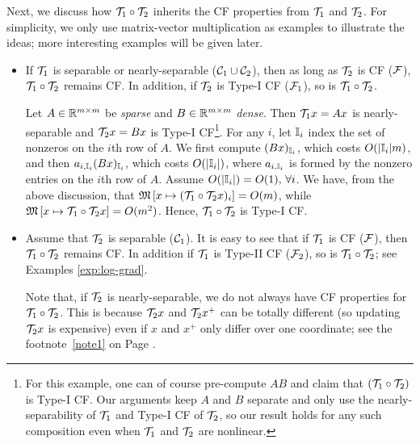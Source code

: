 Next, we discuss how ${\mathcal{T}}_1\circ {\mathcal{T}}_2$ inherits the CF properties from ${\mathcal{T}}_1$ and ${\mathcal{T}}_2$. For simplicity, we only use matrix-vector multiplication as examples to illustrate the ideas; more interesting examples will be given later.%
\begin{itemize}

\item If ${\mathcal{T}}_1$ is separable or nearly-separable (${\mathcal{C}}_1\cup{\mathcal{C}}_2$), then as long as ${\mathcal{T}}_2$ is CF (${\mathcal{F}}$), ${\mathcal{T}}_1\circ{\mathcal{T}}_2$ remains CF. In addition, if ${\mathcal{T}}_2$ is Type-I CF (${\mathcal{F}}_1$), so is ${\mathcal{T}}_1\circ{\mathcal{T}}_2$. 
\begin{example}\label{exp:sp-dens}
Let $A\in\mathbb{R}^{m\times m}$ be \emph{sparse} and $B\in\mathbb{R}^{m\times m}$ \emph{dense}. Then ${\mathcal{T}}_1 x=Ax$ is nearly-separable and ${\mathcal{T}}_2 x=Bx$ is Type-I CF\footnote{For this example, one can of course pre-compute $AB$ and claim that $({\mathcal{T}}_1\circ{\mathcal{T}}_2)$ is Type-I CF. Our arguments keep $A$ and $B$ separate and only use the nearly-separability of ${\mathcal{T}}_1$ and Type-I CF of ${\mathcal{T}}_2$, so our result holds for any such composition even when ${\mathcal{T}}_1$ and ${\mathcal{T}}_2$ are nonlinear.}.  For any $i$, let $\mathbb{I}_i$ index the set of nonzeros on the $i$th row of $A$. We first compute $(Bx)_{\mathbb{I}_i}$, which costs $O(|\mathbb{I}_i|m)$, and then $a_{i,\mathbb{I}_i} (Bx)_{\mathbb{I}_i}$, which costs $O(|\mathbb{I}_i|)$, where $a_{i,\mathbb{I}_i}$ is formed by the nonzero entries on the $i$th row of $A$. Assume $O(|\mathbb{I}_i|)=O(1),\,\forall i$. We have, from the above discussion, that $\mathfrak{M}\left[{x}\mapsto {({\mathcal{T}}_1\circ{\mathcal{T}}_2 x)_i}\right]=O(m)$,
while $\mathfrak{M}\left[{x}\mapsto {{\mathcal{T}}_1\circ{\mathcal{T}}_2 x}\right]=O(m^2)$. Hence, ${\mathcal{T}}_1\circ{\mathcal{T}}_2$ is Type-I CF.
\end{example}


\item Assume that ${\mathcal{T}}_2$ is separable (${\mathcal{C}}_1$). It is easy to see that if ${\mathcal{T}}_1$ is CF (${\mathcal{F}}$), then ${\mathcal{T}}_1\circ {\mathcal{T}}_2$ remains CF. In addition if ${\mathcal{T}}_1$ is Type-II CF (${\mathcal{F}}_2$), so is ${\mathcal{T}}_1\circ{\mathcal{T}}_2$; see Examples \ref{exp:log-grad}. %

Note that, if ${\mathcal{T}}_2$ is nearly-separable, we do not always have CF properties for ${\mathcal{T}}_1\circ{\mathcal{T}}_2$. This is because ${\mathcal{T}}_2 x$ and ${\mathcal{T}}_2 x^+$ can be totally different (so updating ${\mathcal{T}}_2 x$ is expensive) even if $x$ and $x^+$ only differ  over one coordinate; see the  footnote~\ref{note1} on Page \pageref{note1}. %



\end{itemize}
